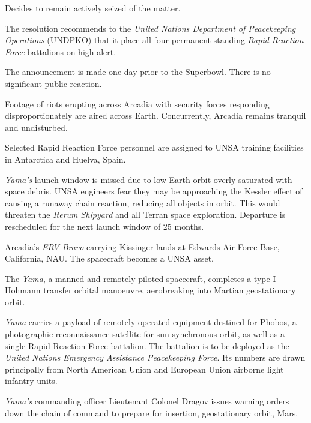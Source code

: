 \item Decides to remain actively seized of the matter.
\stopitemize
\stopTimelineDocument

The resolution recommends to the {\it United Nations Department of Peacekeeping Operations} (UNDPKO) that it place all four permanent standing {\it Rapid Reaction Force} battalions on high alert.

The announcement is made one day prior to the Superbowl. There is no significant public reaction.
\StopTimelineDate

Footage of riots erupting across Arcadia with security forces responding disproportionately are aired across Earth. Concurrently, Arcadia remains tranquil and undisturbed.
\StopTimelineDate

Selected Rapid Reaction Force personnel are assigned to UNSA training facilities in Antarctica and Huelva, Spain.
\StopTimelineDate

{\it Yama's} launch window is missed due to low-Earth orbit overly saturated with space debris. UNSA engineers fear they may be approaching the Kessler effect of causing a runaway chain reaction, reducing all objects in orbit. This would threaten the {\it Iterum Shipyard} and all Terran space exploration. Departure is rescheduled for the next launch window of 25 months.
\StopTimelineDate

Arcadia's {\it ERV Bravo} carrying Kissinger lands at Edwards Air Force Base, California, NAU. The spacecraft becomes a UNSA asset.
\StopTimelineDate

The {\it Yama}, a manned and remotely piloted spacecraft, completes a type I Hohmann transfer orbital manoeuvre, aerobreaking into Martian geostationary orbit. 

{\it Yama} carries a payload of remotely operated equipment destined for Phobos, a photographic reconnaissance satellite for sun-synchronous orbit, as well as a single Rapid Reaction Force battalion. The battalion is to be deployed as the {\it United Nations Emergency Assistance Peacekeeping Force}. Its numbers are drawn principally from North American Union and European Union airborne light infantry units.
\StopTimelineDate

{\it Yama's} commanding officer Lieutenant Colonel Dragov issues warning orders down the chain of command to prepare for insertion, geostationary orbit, Mars.
\StopTimelineDate

